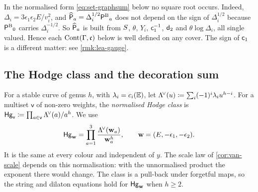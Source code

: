 \begin{rmk}
\label{rmk:set-signs}
In the normalised form \eqref{eq:set-graphsum} below no square root occurs. Indeed, $\Delta_i=3\epsilon_1\epsilon_2E/v_i^2$, and $\widehat{\mathsf{P}}_a=\Delta_i^{1/2}{\mathsf{P}^{\mathrm{B}}}_a$ does not depend on the sign of $\Delta_i^{1/2}$ because ${\mathsf{P}^{\mathrm{B}}}_0$ carries $\Delta_i^{-1/2}$. So $\widehat{\mathsf{P}}_a$ is built from $S$, $\theta$, $Y_i$, $\mathsf{c}_{1}^{-1}$, $\mathsf{d}_{2}$ and $\theta\log\Delta_i$, all single valued. Hence each $\mathrm{Cont}(\Gamma,\mathfrak{c})$ below is well defined on any cover. The sign of $\mathsf{c}_{1}$ is a different matter: see \cref{rmk:lea-gauge}.
\end{rmk}

\subsection{The Hodge class and the decoration sum}
\label{sec:set-graphsum}

For a stable curve of genus $h$, with $\lambda_i=c_i(\mathbb{E})$, let $\Lambda^{\!\vee}(u)\coloneqq\sum_i(-1)^i\lambda_iu^{h-i}$. For a multiset $\mathsf{v}$ of non-zero weights, the \emph{normalised Hodge class} is $\mathsf{Hg}_{\mathsf{v}}\coloneqq\prod_{a\in\mathsf{v}}\Lambda^{\!\vee}(a)/a^h$. We use
\begin{equation}
\label{eq:set-Hg}
\mathsf{Hg}_{\mathbf{w}}=\prod_{a=1}^{3}\frac{\Lambda^{\!\vee}(\mathbf{w}_a)}{\mathbf{w}_a^{h}},\qquad\mathbf{w}=(E,-\epsilon_1,-\epsilon_2).
\end{equation}
It is the same at every colour and independent of $y$. The scale law of \cref{cor:van-scale} depends on this normalisation: with the unnormalised product the exponent there would change. The class is a pull-back under forgetful maps, so the string and dilaton equations hold for $\mathsf{Hg}_{\mathbf{w}}$ when $h\geq2$.

